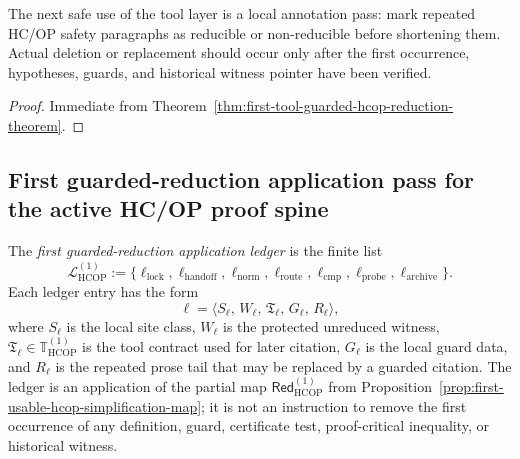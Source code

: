 \begin{corollary}
\label{cor:v3340-r11-working-rule}
The next safe use of the tool layer is a local annotation pass: mark repeated HC/OP safety paragraphs as reducible or non-reducible before shortening them. Actual deletion or replacement should occur only after the first occurrence, hypotheses, guards, and historical witness pointer have been verified.
\end{corollary}

\begin{proof}
Immediate from Theorem~\ref{thm:first-tool-guarded-hcop-reduction-theorem}.
\end{proof}



\subsection{First guarded-reduction application pass for the active HC/OP proof spine}
\label{subsec:first-guarded-reduction-application-pass-active-hcop-proof-spine}

\begin{definition}
\label{def:first-guarded-reduction-application-ledger}
The \emph{first guarded-reduction application ledger} is the finite list
\[
 \mathcal L_{\mathrm{HCOP}}^{(1)}
 :=
 \{\ell_{\mathrm{lock}},\ell_{\mathrm{handoff}},\ell_{\mathrm{norm}},
 \ell_{\mathrm{route}},\ell_{\mathrm{cmp}},\ell_{\mathrm{probe}},
 \ell_{\mathrm{archive}}\}.
\]
Each ledger entry has the form
\[
 \ell
 =
 \langle S_{\ell},\, W_{\ell},\, \mathfrak T_{\ell},\,
 G_{\ell},\, R_{\ell}\rangle,
\]
where \(S_{\ell}\) is the local site class, \(W_{\ell}\) is the protected unreduced witness, \(\mathfrak T_{\ell}\in\mathbb T_{\mathrm{HCOP}}^{(1)}\) is the tool contract used for later citation, \(G_{\ell}\) is the local guard data, and \(R_{\ell}\) is the repeated prose tail that may be replaced by a guarded citation. The ledger is an application of the partial map \(\mathsf{Red}_{\mathrm{HCOP}}^{(1)}\) from Proposition~\ref{prop:first-usable-hcop-simplification-map}; it is not an instruction to remove the first occurrence of any definition, guard, certificate test, proof-critical inequality, or historical witness.
\end{definition}

